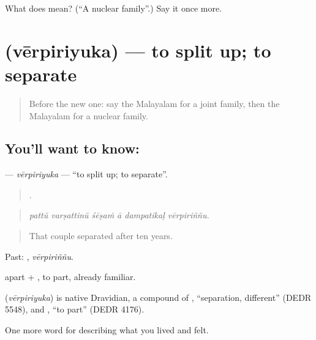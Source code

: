 \begin{tcolorbox}[breakable,colback=teal!4,colframe=teal!35!black,title={Before you move on}]
What does  mean? (\textquotedblleft{}A nuclear family\textquotedblright{}.) Say it once more.
\end{tcolorbox}
\section[\texorpdfstring{\ml{വേർപിരിയുക} (vērpiriyuka)}{വേർപിരിയുക (vērpiriyuka)}]{ (vērpiriyuka) — to split up; to separate}

\label{lesson:ML-C555-verpiriyuka}



\begin{quote}
Before the new one: say the Malayalam for a joint family, then the Malayalam for a nuclear family.
\end{quote}

\subsection*{You'll want to know: }
\textbf{} — \emph{vērpiriyuka} — \textquotedblleft{}to split up; to separate\textquotedblright{}.

\begin{quote}
     .
\end{quote}

\begin{quote}
\emph{pattŭ varṣattinŭ śēṣaṁ ā dampatikaḷ vērpiriññu.}
\end{quote}

\begin{quote}
That couple separated after ten years.
\end{quote}

Past: , \emph{vērpiriññu}.

 apart + , to part, already familiar.

\begin{cousinweb}
\textbf{} (\emph{vērpiriyuka}) is native Dravidian, a compound of , \textquotedblleft{}separation, different\textquotedblright{} (DEDR 5548), and , \textquotedblleft{}to part\textquotedblright{} (DEDR 4176).
\end{cousinweb}

\begin{grammarlens}[title={What you've built}]
One more word for describing what you lived and felt.
\end{grammarlens}

